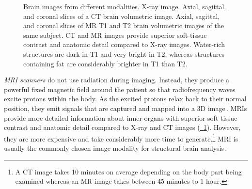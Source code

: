 
\begin{figure}[!ht]
    \centering
    
    
    
    \caption[Brain images from different modalities]{Brain images from different modalities.  X-ray image.  Axial, sagittal, and coronal slices of a CT brain volumetric image.  Axial, sagittal, and coronal slices of MR T1 and T2 brain volumetric images of the same subject. CT and MR images provide superior soft-tissue contrast and anatomic detail compared to X-ray images. Water-rich structures are dark in T1 and very bright in T2, whereas structures containing fat are considerably brighter in T1 than T2.}
    \clearpage
    \label{fig:image_modalities}
\end{figure}


\emph{MRI scanners} do not use radiation during imaging. Instead, they produce a powerful fixed magnetic field around the patient so that radiofrequency waves excite protons within the body. As the excited protons relax back to their normal position, they emit signals that are captured and mapped into a 3D image\,\cite{Runge-2018-Book-ClinicalMR,Bercovich-2018-Rambam-Medical}. MRIs provide more detailed information about inner organs with superior soft-tissue contrast and anatomic detail compared to X-ray and CT images (\hyperref[fig:image_modalities]{\fig~\ref{fig:image_modalities}}). However, they are more expensive and take considerably more time to generate.\footnote{A CT image takes 10 minutes on average depending on the body part being examined whereas an MR image takes between 45 minutes to 1 hour.} MRI is usually the commonly chosen image modality for structural brain analysis\,\cite{Akkus-2017-DLForBrainSegmentation}.

